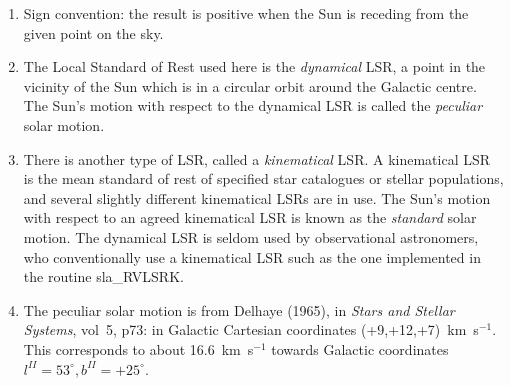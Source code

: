 \notes
{
 \begin{enumerate}
  \item Sign convention: the result is positive when
        the Sun is receding from the given point on the sky.
  \item The Local Standard of Rest used here is the {\it dynamical}\/ LSR,
        a point in the vicinity of the Sun which is in a circular
        orbit around the Galactic centre.  The Sun's motion with
        respect to the dynamical LSR is called the {\it peculiar}\/ solar
        motion.
  \item There is another type of LSR, called a {\it kinematical}\/ LSR.  A
        kinematical LSR is the mean standard of rest of specified star
        catalogues or stellar populations, and several slightly
        different kinematical LSRs are in use.  The Sun's motion with
        respect to an agreed kinematical LSR is known as the
        {\it standard}\/ solar motion.
        The dynamical LSR is seldom used by observational astronomers,
        who conventionally use a kinematical LSR such as the one implemented
        in the routine sla\_RVLSRK.
  \item The peculiar solar motion is from Delhaye (1965), in {\it Stars
        and Stellar Systems}, vol~5, p73:  in Galactic Cartesian
        coordinates (+9,+12,+7)~km~s$^{-1}$.
        This corresponds to about 16.6~km~s$^{-1}$
        towards Galactic coordinates $l^{I\!I}=53^{\circ},b^{I\!I}=+25^{\circ}$.
 \end{enumerate}
}
{
}
{
}
{
}
\notes
